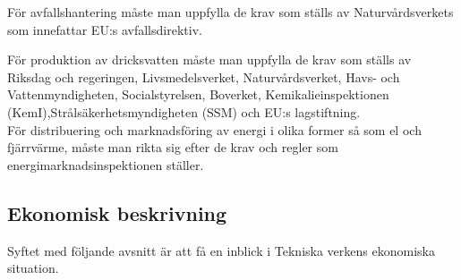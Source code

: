 \documentclass[10pt,a4paper]{article}
\begin{document}
För avfallshantering måste man uppfylla de krav som ställs av Naturvårdsverkets
som innefattar EU:s avfallsdirektiv.

För produktion av dricksvatten måste man uppfylla de krav som ställs av Riksdag
och regeringen, Livsmedelsverket, Naturvårdsverket, Havs- och Vattenmyndigheten,
Socialstyrelsen, Boverket, Kemikalieinspektionen (KemI),Strålsäkerhetsmyndigheten 
(SSM) och EU:s lagstiftning.\\

För distribuering och marknadsföring av energi i olika former så som el och
fjärrvärme, måste man rikta sig efter de krav och regler som
energimarknadsinspektionen ställer.


\subsection{Ekonomisk beskrivning}
Syftet med följande avsnitt är att få en inblick i Tekniska verkens ekonomiska
situation.
\end{document}
